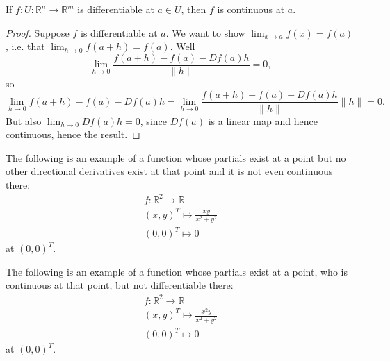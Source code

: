 \documentclass[12pt]{article}
\begin{document}
\begin{proposition}
	If $f:U:\mathbb{R}^n\to\mathbb{R}^m$ is differentiable at $a\in U$, then $f$ is continuous at $a$.
\end{proposition}
\begin{proof}
	Suppose $f$ is differentiable at $a$. We want to show $\lim_{x\to a}f(x)=f(a)$, i.e. that $\lim_{h\to 0}f(a+h)=f(a)$. Well
	\begin{equation*}
		\lim_{h\to 0}\frac{f(a+h)-f(a)-Df(a)h}{\|h\|}=0,
	\end{equation*}
	so 
	\begin{equation*}
		\lim_{h\to 0}f(a+h)-f(a)-Df(a)h=\lim_{h\to 0}\frac{f(a+h)-f(a)-Df(a)h}{\|h\|}\|h\|= 0.
	\end{equation*}
	But also $\lim_{h\to 0} Df(a)h = 0$, since $Df(a)$ is a linear map and hence continuous, hence the result.
\end{proof}

\begin{example}
	The following is an example of a function whose partials exist at a point but no other directional derivatives exist at that point and it is not even continuous there:
	\begin{gather*}
		f: \mathbb{R}^2 \to \mathbb{R} \\
		(x,y)^T \mapsto \frac{xy}{x^2+y^2} \\
		(0, 0)^T \mapsto 0
	\end{gather*}
	at $(0, 0)^T$.
\end{example}

\begin{example}
	The following is an example of a function whose partials exist at a point, who is continuous at that point, but not differentiable there:
	\begin{gather*}
		f: \mathbb{R}^2 \to \mathbb{R} \\
		(x, y)^T \mapsto \frac{x^2y}{x^2+y^2} \\
		(0,0)^T \mapsto 0
	\end{gather*}
	at $(0, 0)^T$.
\end{example}
\end{document}
